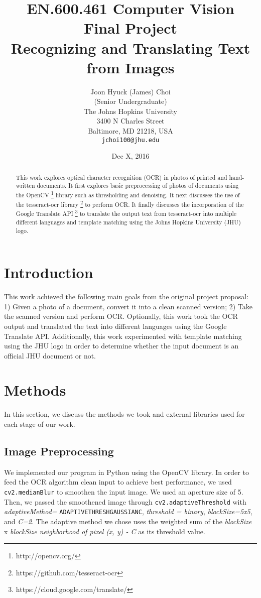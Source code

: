 \documentclass[11pt,letterpaper]{article}
\title{EN.600.461 Computer Vision\\Final Project\\Recognizing and Translating Text from Images}
\author{Joon Hyuck (James) Choi\\
  (Senior Undergraduate)\\
  The Johns Hopkins University\\
  3400 N Charles Street\\
  Baltimore, MD 21218, USA\\
  {\tt jchoi100@jhu.edu}}
\date{Dec X, 2016}
\begin{document}
\maketitle
\begin{abstract}
  This work explores optical character recognition (OCR) in photos of printed and hand-written documents. It first explores basic preprocessing of photos of documents using the OpenCV \footnote{http://opencv.org/} library such as thresholding and denoising. It next discusses the use of the tesseract-ocr library \footnote{https://github.com/tesseract-ocr} to perform OCR. It finally discusses the incorporation of the Google Translate API \footnote{https://cloud.google.com/translate/} to translate the output text from tesseract-ocr into multiple different languages and template matching using the Johns Hopkins University (JHU) logo. 
\end{abstract}

\section{Introduction}

This work achieved the following main goals from the original project proposal: 1) Given a photo of a document, convert it into a clean scanned version; 2) Take the scanned version and perform OCR. Optionally, this work took the OCR output and translated the text into different languages using the Google Translate API. Additionally, this work experimented with template matching using the JHU logo in order to determine whether the input document is an official JHU document or not.

\section{Methods}

In this section, we discuss the methods we took and external libraries used for each stage of our work.

\subsection{Image Preprocessing}

We implemented our program in Python using the OpenCV library. In order to feed the OCR algorithm clean input to achieve best performance, we used {\tt cv2.medianBlur} to smoothen the input image. We used an aperture size of 5. Then, we passed the smoothened image through {\tt cv2.adaptiveThreshold} with \textit{adaptiveMethod=} {\tt ADAPTIVE\textunderscore THRESH\textunderscore GAUSSIAN\textunderscore C}, \textit{threshold = binary}, \textit{blockSize=5x5}, and \textit{C=2}. The adaptive method we chose uses the weighted sum of the \textit{blockSize} x \textit{blockSize neighborhood of pixel (x, y) - C} as its threshold value.
\end{document}
